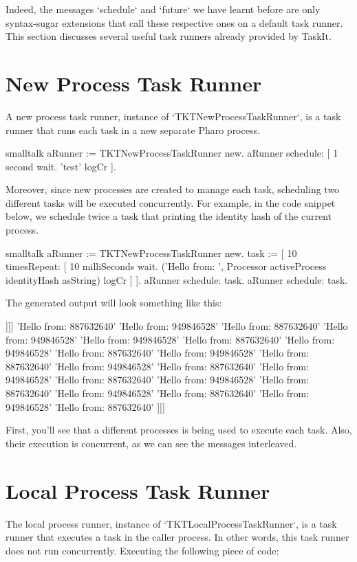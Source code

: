 \documentclass[10pt,twoside,english]{_support/latex/sbabook/sbabook}
\begin{document}
Indeed, the messages `schedule` and `future` we have learnt before are only syntax-sugar extensions that call these respective ones on a default task runner. This section discusses several useful task runners already provided by TaskIt.
\section{New Process Task Runner}
A new process task runner, instance of `TKTNewProcessTaskRunner`, is a task runner that runs each task in a new separate Pharo process. 

\begin{displaycode}{smalltalk}
aRunner := TKTNewProcessTaskRunner new.
aRunner schedule: [ 1 second wait. 'test' logCr ].
\end{displaycode}

Moreover, since new processes are created to manage each task, scheduling two different tasks will be executed concurrently. For example, in the code snippet below, we schedule twice a task that printing the identity hash of the current process.

\begin{displaycode}{smalltalk}
aRunner := TKTNewProcessTaskRunner new.
task := [ 10 timesRepeat: [ 10 milliSeconds wait.
				('Hello from: ', Processor activeProcess identityHash asString) logCr ] ].
aRunner schedule: task.
aRunner schedule: task.
\end{displaycode}

The generated output will look something like this:

{]}{]}{]}
'Hello from: 887632640'
'Hello from: 949846528'
'Hello from: 887632640'
'Hello from: 949846528'
'Hello from: 949846528'
'Hello from: 887632640'
'Hello from: 949846528'
'Hello from: 887632640'
'Hello from: 949846528'
'Hello from: 887632640'
'Hello from: 949846528'
'Hello from: 887632640'
'Hello from: 949846528'
'Hello from: 887632640'
'Hello from: 949846528'
'Hello from: 887632640'
'Hello from: 949846528'
'Hello from: 887632640'
'Hello from: 949846528'
'Hello from: 887632640'
{]}{]}{]}

First, you'll see that a different processes is being used to execute each task. Also, their execution is concurrent, as we can see the messages interleaved.
\section{Local Process Task Runner}
The local process runner, instance of `TKTLocalProcessTaskRunner`, is a task runner that executes a task in the caller process. In other words, this task runner does not run concurrently. Executing the following piece of code:
\end{document}
